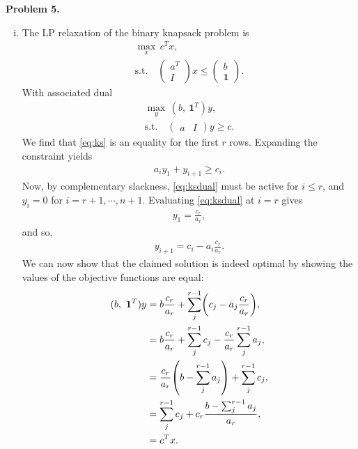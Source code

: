 \documentclass[11pt,a4paper]{article}
\let\originalleft\left
\let\originalright\right
\renewcommand{\left}{\mathopen{}\mathclose\bgroup\originalleft}
\renewcommand{\right}{\aftergroup\egroup\originalright}
\begin{document}
\textbf{Problem 5.}
\begin{enumerate}[i)]
	\item The LP relaxation of the binary knapsack problem is
	\begin{gather}
		\max_x \, c^T x, \\
		\text{s.t.} \quad
		\begin{pmatrix}
			a^T \\
			I
		\end{pmatrix}
		x \leq
		\begin{pmatrix}
			b \\
			\mathbf{1}
		\end{pmatrix}.
		\label{eq:ks}
	\end{gather}
	With associated dual
	\begin{gather*}
		\max_y \, (b, \ \mathbf{1}^T) y, \\
		\text{s.t.} \quad
		\begin{pmatrix}
			a & I
		\end{pmatrix}
		y \geq c.
	\end{gather*}
	We find that \eqref{eq:ks} is an equality for the first $r$ rows. Expanding the constraint yields
	\begin{align}
		a_i y_1 + y_{i+1} \geq c_i.
		\label{eq:ksdual}
	\end{align}
	Now, by complementary slackness, \eqref{eq:ksdual} must be active for $i \leq r$, and $y_i = 0$ for $i = r + 1, \cdots, n + 1$. Evaluating \eqref{eq:ksdual} at $i = r$ gives
	\begin{align*}
		y_1 = \frac{c_r}{a_r},
	\end{align*}
	and so,
	\begin{align*}
		y_{i+1} = c_i - a_i \frac{c_r}{a_r}.
	\end{align*}
	We can now show that the claimed solution is indeed optimal by showing the values of the objective functions are equal:
	\begin{align*}
		(b, \ \mathbf{1}^T) y &= b \frac{c_r}{a_r} + \sum_j^{r-1} \left( c_j - a_j \frac{c_r}{a_r} \right), \\
		&= b \frac{c_r}{a_r} + \sum_j^{r-1} c_j - \frac{c_r}{a_r} \sum_j^{r-1} a_j, \\
		&= \frac{c_r}{a_r} \left( b - \sum_j^{r-1} a_j \right) + \sum_j^{r-1} c_j, \\
		&= \sum_j^{r-1} c_j + c_r \frac{b - \sum_j^{r-1} a_j}{a_r}, \\
		&= c^T x.
	\end{align*}


\end{enumerate}
\end{document}
